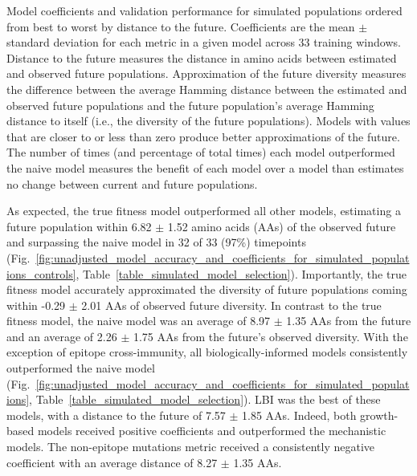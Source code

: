 \begin{table}[ht]
  \begin{center}
    
    \caption{
      Model coefficients and validation performance for simulated populations ordered from best to worst by distance to the future.
      Coefficients are the mean $\pm$ standard deviation for each metric in a given model across 33 training windows.
      Distance to the future measures the distance in amino acids between estimated and observed future populations.
      Approximation of the future diversity measures the difference between the average Hamming distance between the estimated and observed future populations and the future population's average Hamming distance to itself (i.e., the diversity of the future populations).
      Models with values that are closer to or less than zero produce better approximations of the future.
      The number of times (and percentage of total times) each model outperformed the naive model measures the benefit of each model over a model than estimates no change between current and future populations.
    }
    \label{table_simulated_model_selection}
  \end{center}
\end{table}

As expected, the true fitness model outperformed all other models, estimating a future population within 6.82 $\pm$ 1.52 amino acids (AAs) of the observed future and surpassing the naive model in 32 of 33 (97\%) timepoints (Fig.~\ref{fig:unadjusted_model_accuracy_and_coefficients_for_simulated_populations_controls}, Table~\ref{table_simulated_model_selection}).
Importantly, the true fitness model accurately approximated the diversity of future populations coming within -0.29 $\pm$ 2.01 AAs of observed future diversity.
In contrast to the true fitness model, the naive model was an average of 8.97 $\pm$ 1.35 AAs from the future and an average of 2.26 $\pm$ 1.75 AAs from the future's observed diversity.
With the exception of epitope cross-immunity, all biologically-informed models consistently outperformed the naive model (Fig.~\ref{fig:unadjusted_model_accuracy_and_coefficients_for_simulated_populations}, Table~\ref{table_simulated_model_selection}).
LBI was the best of these models, with a distance to the future of 7.57 $\pm$ 1.85 AAs.
Indeed, both growth-based models received positive coefficients and outperformed the mechanistic models.
The non-epitope mutations metric received a consistently negative coefficient with an average distance of 8.27 $\pm$ 1.35 AAs.

